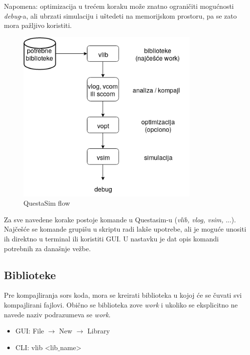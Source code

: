 Napomena: optimizacija u trećem koraku može znatno ograničiti mogućnosti
\emph{debug}-a, ali ubrzati simulaciju i uštedeti na memorijskom prostoru, pa se
zato mora pažljivo koristiti.\\

\begin{figure}[h!]
  \center
  \includegraphics[width=90mm, scale=0.5]{img/v1_flow.png}
  \caption{QuestaSim flow}
  \label{fig:questa_flow}
\end{figure}

Za sve navedene korake postoje komande u Questasim-u (\emph{vlib, vlog, vsim,}
...).
Najčešće se komande grupišu u skriptu radi lakše upotrebe, ali je moguće unositi
ih direktno u terminal ili koristiti GUI.
U nastavku je dat opis komandi potrebnih za današnje vežbe.


\subsection{Biblioteke}

Pre kompajliranja sors koda, mora se kreirati biblioteka u kojoj će se čuvati
svi kompajlirani fajlovi. Obično se biblioteka zove \emph{work} i ukoliko se
eksplicitno ne navede naziv podrazumeva se \emph{work}.

\begin{itemize}
\item GUI: File \(\rightarrow\) New \(\rightarrow\) Library
\item CLI: vlib \textless lib\(\_\)name\textgreater
\end{itemize}

